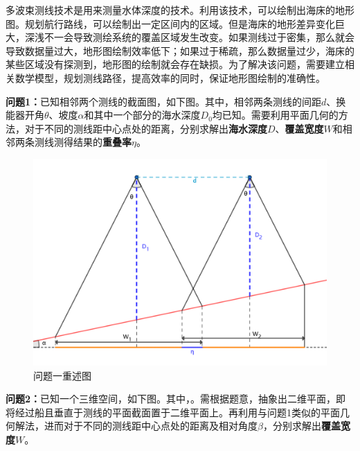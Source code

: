 \setcounter{page}{1}




多波束测线技术是用来测量水体深度的技术。利用该技术，可以绘制出海床的地形图。规划航行路线，可以绘制出一定区间内的区域。但是海床的地形差异变化巨大，深浅不一会导致测绘系统的覆盖区域发生改变。如果测线过于密集，那么就会导致数据量过大，地形图绘制效率低下；如果过于稀疏，那么数据量过少，海床的某些区域没有探测到，地形图的绘制就会存在缺损。为了解决该问题，需要建立相关数学模型，规划测线路径，提高效率的同时，保证地形图绘制的准确性。


\textbf{问题1：}已知相邻两个测线的截面图，如下图。其中，相邻两条测线的间距$d$、换能器开角$\theta$、坡度$\alpha$和其中一个部分的海水深度$D_0$均已知。需要利用平面几何的方法，对于不同的测线距中心点处的距离，分别求解出\textbf{海水深度}$D$、\textbf{覆盖宽度}$W$和相邻两条测线测得结果的\textbf{重叠率}$\eta$。

\begin{figure}[h]   
    \centering
    \includegraphics[scale=0.3]{res/img/问题一重述图.png}
    \caption{问题一重述图}
    \label{fig:问题一重述图}
\end{figure}

\textbf{问题2：}已知一个三维空间，如下图。其中，。需根据题意，抽象出二维平面，即将经过船且垂直于测线的平面截面置于二维平面上。再利用与问题1类似的平面几何解法，进而对于不同的测线距中心点处的距离及相对角度$\beta$，分别求解出\textbf{覆盖宽度}$W$。

